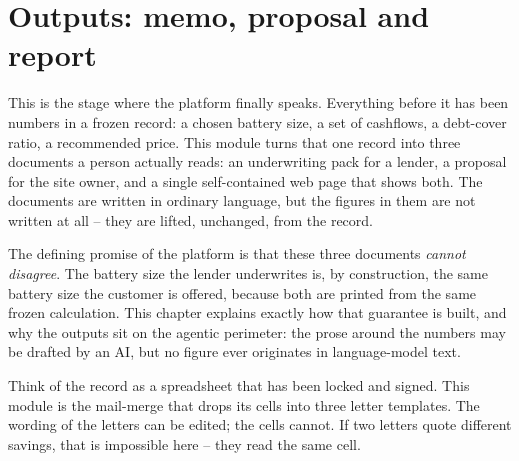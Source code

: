 \chapter{Outputs: memo, proposal and report}
\label{ch:outputs}

This is the stage where the platform finally speaks. Everything before it has been numbers in a frozen record: a chosen battery size, a set of cashflows, a debt-cover ratio, a recommended price. This module turns that one record into three documents a person actually reads: an underwriting pack for a lender, a proposal for the site owner, and a single self-contained web page that shows both. The documents are written in ordinary language, but the figures in them are not written at all -- they are lifted, unchanged, from the record.

The defining promise of the platform is that these three documents \emph{cannot disagree}. The battery size the lender underwrites is, by construction, the same battery size the customer is offered, because both are printed from the same frozen calculation. This chapter explains exactly how that guarantee is built, and why the outputs sit on the agentic perimeter: the prose around the numbers may be drafted by an AI, but no figure ever originates in language-model text.

\begin{plainnote}
Think of the record as a spreadsheet that has been locked and signed. This module is the mail-merge that drops its cells into three letter templates. The wording of the letters can be edited; the cells cannot. If two letters quote different savings, that is impossible here -- they read the same cell.
\end{plainnote}


